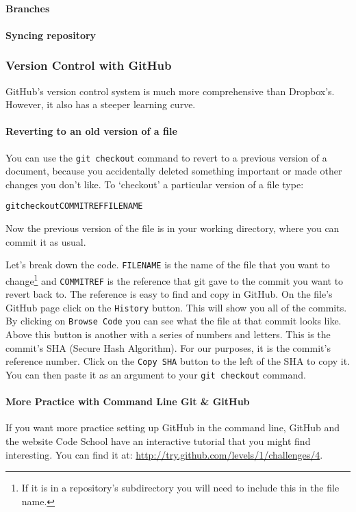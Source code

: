 \paragraph{Branches}

\paragraph{Syncing repository}

\subsubsection{Version Control with GitHub}

GitHub's version control system is much more comprehensive than Dropbox's. However, it also has a steeper learning curve.

\paragraph{Reverting to an old version of a file}

You can use the {\tt{git checkout}} command to revert to a previous version of a document, because you accidentally deleted something important or made other changes you don't like. To `checkout' a particular version of a file type:

\begin{knitrout}
\color{fgcolor}\begin{kframe}
\begin{alltt}
git checkout COMMITREF FILENAME
\end{alltt}
\end{kframe}
\end{knitrout}


\noindent Now the previous version of the file is in your working directory, where you can commit it as usual.

Let's break down the code.  {\tt{FILENAME}} is the name of the file that you want to change\footnote{If it is in a repository's subdirectory you will need to include this in the file name.} and {\tt{COMMITREF}} is the reference that git gave to the commit you want to revert back to. The reference is easy to find and copy in GitHub. On the file's GitHub page click on the {\tt{History}} button. This will show you all of the commits. By clicking on {\tt{Browse Code}} you can see what the file at that commit looks like. Above this button is another with a series of numbers and letters. This is the commit's SHA (Secure Hash Algorithm). For our purposes, it is the commit's reference number. Click on the {\tt{Copy SHA}} button to the left of the SHA to copy it. You can then paste it as an argument to your {\tt{git checkout}} command. 

\paragraph{More Practice with Command Line Git \& GitHub}

If you want more practice setting up GitHub in the command line, GitHub and the website Code School have an interactive tutorial that you might find interesting. You can find it at: \url{http://try.github.com/levels/1/challenges/4}.
